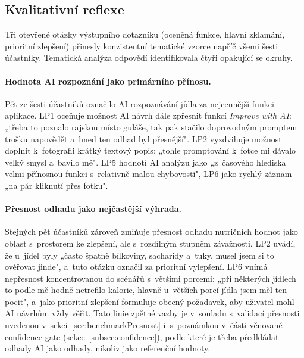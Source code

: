 \subsection{Kvalitativní reflexe}
\label{subsec:kvalitativniReflexe}

Tři otevřené otázky výstupního dotazníku (oceněná funkce, hlavní zklamání, prioritní zlepšení) přinesly konzistentní tematické vzorce napříč všemi šesti účastníky.
Tematická analýza odpovědí identifikovala čtyři opakující se okruhy.

\paragraph{Hodnota AI rozpoznání jako primárního přínosu.}
Pět ze šesti účastníků označilo AI rozpoznávání jídla za nejcennější funkci aplikace.
LP1 oceňuje možnost AI návrh dále zpřesnit funkcí \emph{Improve with AI}: „třeba to poznalo rajskou místo guláše, tak pak stačilo doprovodným promptem trošku napovědět a~hned ten odhad byl přesnější".
LP2 vyzdvihuje možnost doplnit k~fotografii krátký textový popis: „tohle promptování k~fotce mi dávalo velký smysl a~bavilo mě".
LP5 hodnotí AI analýzu jako „z~časového hlediska velmi přínosnou funkci s~relativně malou chybovostí", LP6 jako rychlý záznam „na pár kliknutí přes fotku".

\paragraph{Přesnost odhadu jako nejčastější výhrada.}
Stejných pět účastníků zároveň zmiňuje přesnost odhadu nutričních hodnot jako oblast s~prostorem ke zlepšení, ale s~rozdílným stupněm závažnosti.
LP2 uvádí, že u~jídel byly „často špatně bílkoviny, sacharidy a~tuky, musel jsem si to ověřovat jinde", a~tuto otázku označil za prioritní vylepšení.
LP6 vnímá nepřesnost koncentrovanou do scénářů s~většími porcemi: „při některých jídlech to podle mě hodně netrefilo kalorie, hlavně u~větších porcí jídla jsem měl ten pocit", a~jako prioritní zlepšení formuluje obecný požadavek, aby uživatel mohl AI návrhům vždy věřit.
Tato linie zpětné vazby je v~souladu s~validací přesnosti uvedenou v~sekci~\ref{sec:benchmarkPresnost} i~s~poznámkou v~části věnované confidence gate (sekce~\ref{subsec:confidence}), podle které je třeba předkládat odhady AI jako odhady, nikoliv jako referenční hodnoty.


